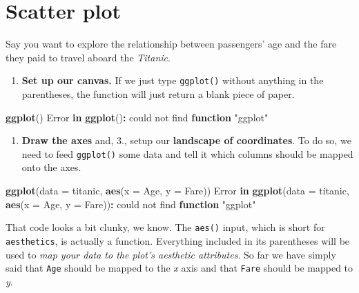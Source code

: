 \documentclass[
]{book}
\newenvironment{Shaded}{\begin{snugshade}}{\end{snugshade}}
\newcommand{\AttributeTok}[1]{\textcolor[rgb]{0.13,0.29,0.53}{#1}}
\newcommand{\ControlFlowTok}[1]{\textcolor[rgb]{0.13,0.29,0.53}{\textbf{#1}}}
\newcommand{\FunctionTok}[1]{\textcolor[rgb]{0.13,0.29,0.53}{\textbf{#1}}}
\newcommand{\NormalTok}[1]{#1}
\newcommand{\SpecialCharTok}[1]{\textcolor[rgb]{0.81,0.36,0.00}{\textbf{#1}}}
\newcommand{\StringTok}[1]{\textcolor[rgb]{0.31,0.60,0.02}{#1}}
\providecommand{\tightlist}{%
  \setlength{\itemsep}{0pt}\setlength{\parskip}{0pt}}
\begin{document}
\section*{Scatter plot}\label{scatter-plot}

Say you want to explore the relationship between passengers' age and the fare they paid to travel aboard the \emph{Titanic}.

\begin{enumerate}
\def\labelenumi{(\arabic{enumi})}
\tightlist
\item
  \textbf{Set up our canvas.} If we just type \texttt{ggplot()} without anything in the parentheses, the function will just return a blank piece of paper.
\end{enumerate}

\begin{Shaded}
\begin{Highlighting}[]
\FunctionTok{ggplot}\NormalTok{()}
\NormalTok{Error }\ControlFlowTok{in} \FunctionTok{ggplot}\NormalTok{()}\SpecialCharTok{:}\NormalTok{ could not find }\ControlFlowTok{function} \StringTok{"ggplot"}
\end{Highlighting}
\end{Shaded}

\begin{enumerate}
\def\labelenumi{(\arabic{enumi})}
\setcounter{enumi}{1}
\tightlist
\item
  \textbf{Draw the axes} and, 3., setup our \textbf{landscape of coordinates}. To do so, we need to feed \texttt{ggplot()} some data and tell it which columns should be mapped onto the axes.
\end{enumerate}

\begin{Shaded}
\begin{Highlighting}[]
\FunctionTok{ggplot}\NormalTok{(}\AttributeTok{data =}\NormalTok{ titanic, }
       \FunctionTok{aes}\NormalTok{(}\AttributeTok{x =}\NormalTok{ Age, }\AttributeTok{y =}\NormalTok{ Fare))}
\NormalTok{Error }\ControlFlowTok{in} \FunctionTok{ggplot}\NormalTok{(}\AttributeTok{data =}\NormalTok{ titanic, }\FunctionTok{aes}\NormalTok{(}\AttributeTok{x =}\NormalTok{ Age, }\AttributeTok{y =}\NormalTok{ Fare))}\SpecialCharTok{:}\NormalTok{ could not find }\ControlFlowTok{function} \StringTok{"ggplot"}
\end{Highlighting}
\end{Shaded}

That code looks a bit clunky, we know. The \texttt{aes()} input, which is short for \texttt{aesthetics}, is actually a function. Everything included in its parentheses will be used to \emph{map your data to the plot's aesthetic attributes}. So far we have simply said that \texttt{Age} should be mapped to the \emph{x} axis and that \texttt{Fare} should be mapped to \emph{y}.
\end{document}
